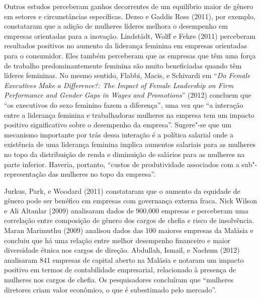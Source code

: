 Outros estudos perceberam ganhos decorrentes de um equilíbrio maior de
gênero em setores e circunstâncias específicas. Dezso e Gaddis Ross
(2011), por exemplo, constataram que a adição de mulheres líderes
melhora o desempenho em empresas orientadas para a inovação. Lindstädt,
Wolff e Fehre (2011) perceberam resultados positivos no aumento da
liderança feminina em empresas orientadas para o consumidor. Eles também
perceberam que as empresas que têm uma força de trabalho
predominantemente feminina são muito beneficiadas quando têm líderes
femininas. No mesmo sentido, Flabbi, Macis, e Schivardi em ``\emph{Do
Female Executives Make a Difference?: The Impact of Female Leadership on
Firm Performance and Gender Gaps in Wages and Promotions}'' (2012)
concluem que ``os executivos do sexo feminino fazem a diferença'', uma
vez que ``a interação entre a liderança feminina e trabalhadoras
mulheres na empresa tem um impacto positivo significativo sobre o
desempenho da empresa''. Sugere"-se que um mecanismo importante por trás
dessa interação é a política salarial onde a existência de uma liderança
feminina implica aumentos salariais para as mulheres no topo da
distribuição de renda e diminuição de salários para as mulheres na parte
inferior. Haveria, portanto, ``custos de produtividade associados com a
sub"-representação das mulheres no topo da empresa''.

Jurkus, Park, e Woodard (2011) constataram que o aumento da equidade de
gênero pode ser benéfico em empresas com governança externa fraca. Nick
Wilson e Ali Altanlar (2009) analisaram dados de 900,000 empresas e
perceberam uma correlação entre composição de gênero dos cargos de
chefia e risco de insolvência. Maran Marimuthu (2009) analisou dados das
100 maiores empresas da Malásia e concluiu que há uma relação entre
melhor desempenho financeiro e maior diversidade étnica nos cargos de
direção. Abdullah, Ismail, e Nachum (2012) analisaram 841 empresas de
capital aberto na Malásia e notaram um impacto positivo em termos de
contabilidade empresarial, relacionado à presença de mulheres nos cargos
de chefia. Os pesquisadores concluíram que ``mulheres diretores criam
valor econômico, o que é subestimado pelo mercado''.

